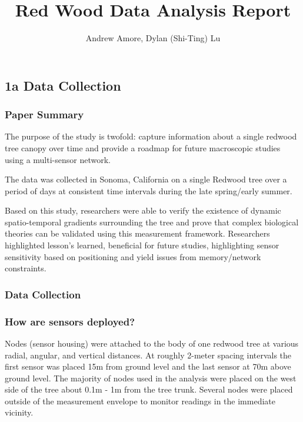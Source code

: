 \documentclass[
  twocolumn]{article}
\title{Red Wood Data Analysis Report}
\author{Andrew Amore, Dylan (Shi-Ting) Lu}
\date{}
\begin{document}
\maketitle

\hypertarget{a-data-collection}{%
\subsection{1a Data Collection}\label{a-data-collection}}

\hypertarget{paper-summary}{%
\subsubsection{Paper Summary}\label{paper-summary}}

The purpose of the study is twofold: capture information about a single
redwood tree canopy over time and provide a roadmap for future
macroscopic studies using a multi-sensor network.

The data was collected in Sonoma, California on a single Redwood tree
over a period of days at consistent time intervals during the late
spring/early summer.

Based on this study, researchers were able to verify the existence of
dynamic spatio-temporal gradients surrounding the tree and prove that
complex biological theories can be validated using this measurement
framework. Researchers highlighted lesson's learned, beneficial for
future studies, highlighting sensor sensitivity based on positioning and
yield issues from memory/network constraints.

\hypertarget{data-collection}{%
\subsubsection{Data Collection}\label{data-collection}}

\hypertarget{how-are-sensors-deployed}{%
\subsubsection{How are sensors
deployed?}\label{how-are-sensors-deployed}}

Nodes (sensor housing) were attached to the body of one redwood tree at
various radial, angular, and vertical distances. At roughly 2-meter
spacing intervals the first sensor was placed 15m from ground level and
the last sensor at 70m above ground level. The majority of nodes used in
the analysis were placed on the west side of the tree about 0.1m - 1m
from the tree trunk. Several nodes were placed outside of the
measurement envelope to monitor readings in the immediate vicinity.
\end{document}
